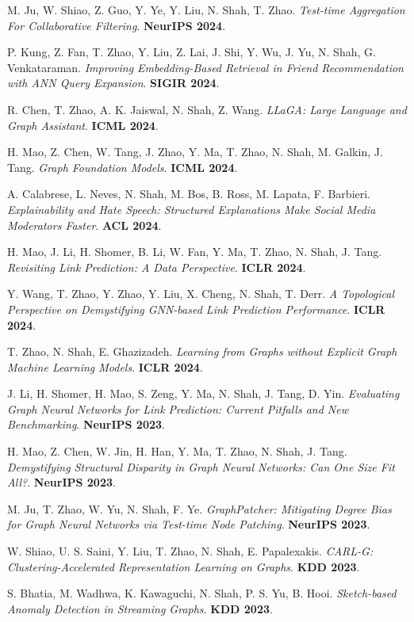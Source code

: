 \documentclass{article}
\begin{document}
\begin{etaremune}[itemsep=1pt,parsep=0pt]
\item M. Ju, W. Shiao, Z. Guo, Y. Ye, Y. Liu, N. Shah, T. Zhao. \emph{Test-time Aggregation For Collaborative Filtering}. \textbf{NeurIPS 2024}.
\item P. Kung, Z. Fan, T. Zhao, Y. Liu, Z. Lai, J. Shi, Y. Wu, J. Yu, N. Shah, G. Venkataraman. \emph{Improving Embedding-Based Retrieval in Friend Recommendation with ANN Query Expansion}. \textbf{SIGIR 2024}.
\item R. Chen, T. Zhao, A. K. Jaiswal, N. Shah, Z. Wang. \emph{LLaGA: Large Language and Graph Assistant}. \textbf{ICML 2024}.
\item H. Mao, Z. Chen, W. Tang, J. Zhao, Y. Ma, T. Zhao, N. Shah, M. Galkin, J. Tang. \emph{Graph Foundation Models}. \textbf{ICML 2024}.
\item A. Calabrese, L. Neves, N. Shah, M. Bos, B. Ross, M. Lapata, F. Barbieri. \emph{Explainability and Hate Speech: Structured Explanations Make Social Media Moderators Faster}. \textbf{ACL 2024}.
\item H. Mao, J. Li, H. Shomer, B. Li, W. Fan, Y. Ma, T. Zhao, N. Shah, J. Tang. \emph{Revisiting Link Prediction: A Data Perspective}. \textbf{ICLR 2024}.
\item Y. Wang, T. Zhao, Y. Zhao, Y. Liu, X. Cheng, N. Shah, T. Derr. \emph{A Topological Perspective on Demystifying GNN-based Link Prediction Performance}. \textbf{ICLR 2024}.
\item T. Zhao, N. Shah, E. Ghazizadeh. \emph{Learning from Graphs without Explicit Graph Machine Learning Models}. \textbf{ICLR 2024}.
\item J. Li, H. Shomer, H. Mao, S. Zeng, Y. Ma, N. Shah, J. Tang, D. Yin. \emph{Evaluating Graph Neural Networks for Link Prediction: Current Pitfalls and New Benchmarking}. \textbf{NeurIPS 2023}.
\item H. Mao, Z. Chen, W. Jin, H. Han, Y. Ma, T. Zhao, N. Shah, J. Tang. \emph{Demystifying Structural Disparity in Graph Neural Networks: Can One Size Fit All?}. \textbf{NeurIPS 2023}.
\item M. Ju, T. Zhao, W. Yu, N. Shah, F. Ye. \emph{GraphPatcher: Mitigating Degree Bias for Graph Neural Networks via Test-time Node Patching}. \textbf{NeurIPS 2023}.
\item W. Shiao, U. S. Saini, Y. Liu, T. Zhao, N. Shah, E. Papalexakis. \emph{CARL-G: Clustering-Accelerated Representation Learning on Graphs}. \textbf{KDD 2023}.
\item S. Bhatia, M. Wadhwa, K. Kawaguchi, N. Shah, P. S. Yu, B. Hooi. \emph{Sketch-based Anomaly Detection in Streaming Graphs}. \textbf{KDD 2023}.

\end{etaremune}
\end{document}
